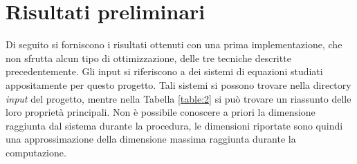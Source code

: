 \documentclass{article}
\begin{document}
\section{Risultati preliminari}
Di seguito si forniscono i risultati ottenuti con una prima implementazione, che non sfrutta alcun tipo di ottimizzazione, delle tre tecniche descritte precedentemente. Gli input si riferiscono a dei sistemi di equazioni studiati appositamente per questo progetto. Tali sistemi si possono trovare nella directory \textit{input} del progetto, mentre nella Tabella \ref{table:2} si può trovare un riassunto delle loro proprietà principali. Non è possibile conoscere a priori la dimensione raggiunta dal sistema durante la procedura, le dimensioni riportate sono quindi una approssimazione della dimensione massima raggiunta durante la computazione. 
\end{document}
